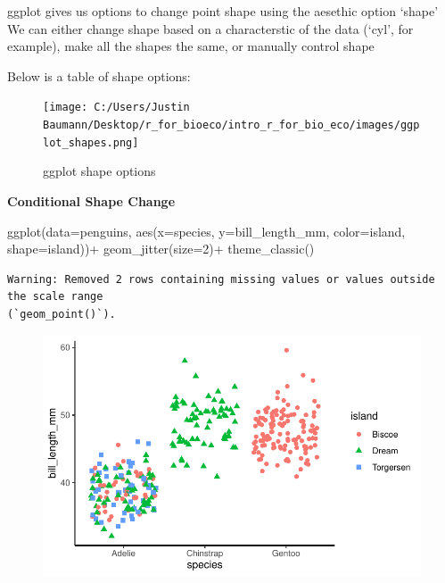 \documentclass[
  letterpaper,
  DIV=11,
  numbers=noendperiod]{scrartcl}
\newenvironment{Shaded}{\begin{snugshade}}{\end{snugshade}}
\newcommand{\AttributeTok}[1]{\textcolor[rgb]{0.40,0.45,0.13}{#1}}
\newcommand{\DecValTok}[1]{\textcolor[rgb]{0.68,0.00,0.00}{#1}}
\newcommand{\FunctionTok}[1]{\textcolor[rgb]{0.28,0.35,0.67}{#1}}
\newcommand{\NormalTok}[1]{\textcolor[rgb]{0.00,0.23,0.31}{#1}}
\newcommand{\SpecialCharTok}[1]{\textcolor[rgb]{0.37,0.37,0.37}{#1}}
\begin{document}
ggplot gives us options to change point shape using the aesethic option
`shape' We can either change shape based on a characterstic of the data
(`cyl', for example), make all the shapes the same, or manually control
shape

Below is a table of shape options:

\begin{figure}

{\centering \texttt{[image: C:/Users/Justin Baumann/Desktop/r\_for\_bioeco/intro\_r\_for\_bio\_eco/images/ggplot\_shapes.png]}

}

\caption{ggplot shape options}

\end{figure}

\textbf{Conditional Shape Change}

\begin{Shaded}
\begin{Highlighting}[]
\FunctionTok{ggplot}\NormalTok{(}\AttributeTok{data=}\NormalTok{penguins, }\FunctionTok{aes}\NormalTok{(}\AttributeTok{x=}\NormalTok{species, }\AttributeTok{y=}\NormalTok{bill\_length\_mm, }\AttributeTok{color=}\NormalTok{island, }\AttributeTok{shape=}\NormalTok{island))}\SpecialCharTok{+} 
  \FunctionTok{geom\_jitter}\NormalTok{(}\AttributeTok{size=}\DecValTok{2}\NormalTok{)}\SpecialCharTok{+}
  \FunctionTok{theme\_classic}\NormalTok{()}
\end{Highlighting}
\end{Shaded}

\begin{verbatim}
Warning: Removed 2 rows containing missing values or values outside the scale range
(`geom_point()`).
\end{verbatim}

\begin{figure}[H]

{\centering \includegraphics{Lab_2_files/figure-pdf/unnamed-chunk-28-1.pdf}

}

\end{figure}
\end{document}
